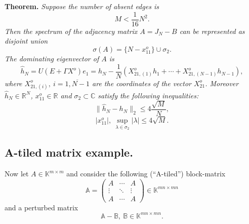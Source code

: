 \documentclass[a4paper]{jpconf}
\begin{document}
\begin{center}
\textbf{Theorem.}
{\it
    Suppose the number of absent edges is
    \[ M < \frac{1}{16} N^2. \]
    Then the spectrum of the adjacency matrix \( A = J_N - B \)
        can be represented as disjoint union
    \[
        \sigma(A) = \{ N - x_{11}^o \} \cup \sigma_2.
    \]
    The dominating eigenvector of \( A \) is
    \[
        \hat{h}_N = U(E+\Gamma X^o) e_1 =
            h_N - \frac1N (X_{21,(1)}^o h_1 + \cdots + X_{21, (N{-}1)}^o h_{N{-}1}),
    \]
    where \( X_{21,(i)}^o,\ i=\overline{1,N{-}1} \) are the coordinates
    of the vector \( X_{21}^o \).
    Moreover \( \hat{h}_N\in\mathbb{R}^{N} \),
    \( x_{11}^o\in\mathbb{R} \) and \( \sigma_2\subset\mathbb{C} \)
    satisfy the following inequalities:
    \[
        \|\hat{h}_N - h_N\|_2 \leq 4\frac{\sqrt{M}}{N},
    \]
    \[
        \lvert x_{11}^o \rvert,
        \ \sup_{\lambda\in\sigma_2} \lvert\lambda\rvert \leq 4\sqrt{M}.
    \]
}
\end{center}

\subsection*{A-tiled matrix example.}

Now let \( A\in\mathbb{K}^{m{\times}m} \)
    and consider the following (``A-tiled'') block-matrix
    \[
        \mathbb{A} =
        \begin{pmatrix}
            A & \cdots & A \\
            \vdots & \ddots & \vdots \\
            A & \cdots & A
        \end{pmatrix}
        \in\mathbb{K}^{{mn}{\times}{mn}}
    \]
    and a perturbed matrix
    \[
        \mathbb{A} - \mathbb{B},\ \mathbb{B}\in\mathbb{K}^{{mn}{\times}{mn}}.
    \]
\end{document}
